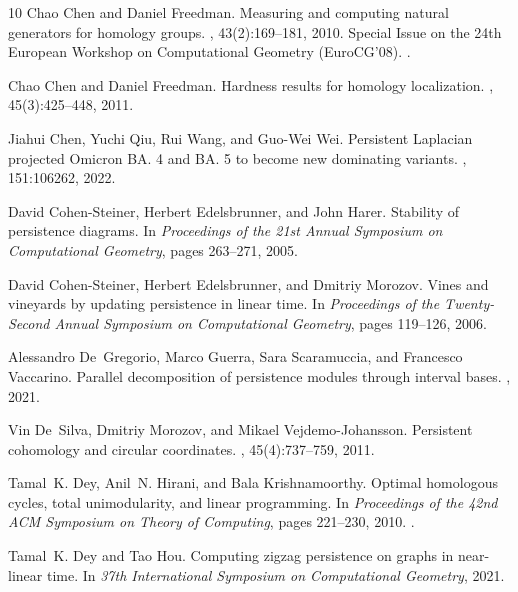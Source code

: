 \begin{thebibliography}{10}
Chao Chen and Daniel Freedman.
\newblock Measuring and computing natural generators for homology groups.
, 43(2):169--181, 2010.
\newblock Special Issue on the 24th European Workshop on Computational Geometry
  (EuroCG'08).
\newblock \href {https://doi.org/10.1016/j.comgeo.2009.06.004}
  {}.

Chao Chen and Daniel Freedman.
\newblock Hardness results for homology localization.
, 45(3):425--448, 2011.

Jiahui Chen, Yuchi Qiu, Rui Wang, and Guo-Wei Wei.
\newblock Persistent {L}aplacian projected {O}micron {BA. 4} and {BA. 5} to
  become new dominating variants.
, 151:106262, 2022.

David Cohen-Steiner, Herbert Edelsbrunner, and John Harer.
\newblock Stability of persistence diagrams.
\newblock In {\em Proceedings of the 21st Annual Symposium on Computational
  Geometry}, pages 263--271, 2005.

David Cohen-Steiner, Herbert Edelsbrunner, and Dmitriy Morozov.
\newblock Vines and vineyards by updating persistence in linear time.
\newblock In {\em Proceedings of the Twenty-Second Annual Symposium on
  Computational Geometry}, pages 119--126, 2006.

Alessandro De~Gregorio, Marco Guerra, Sara Scaramuccia, and Francesco
  Vaccarino.
\newblock Parallel decomposition of persistence modules through interval bases.
, 2021.

Vin De~Silva, Dmitriy Morozov, and Mikael Vejdemo-Johansson.
\newblock Persistent cohomology and circular coordinates.
, 45(4):737--759, 2011.

Tamal~K. Dey, Anil~N. Hirani, and Bala Krishnamoorthy.
\newblock Optimal homologous cycles, total unimodularity, and linear
  programming.
\newblock In {\em Proceedings of the 42nd ACM Symposium on Theory of
  Computing}, pages 221--230, 2010.
\newblock \href {https://doi.org/10.1145/1806689.1806721}
  {}.

Tamal~K. Dey and Tao Hou.
\newblock Computing zigzag persistence on graphs in near-linear time.
\newblock In {\em 37th International Symposium on Computational Geometry},
  2021.


\end{thebibliography}
